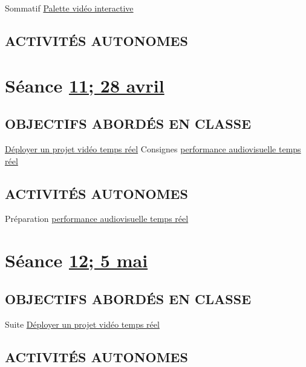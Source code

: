 \documentclass[
  french,
]{book}
\begin{document}
Sommatif \protect\hyperlink{sommatif_4}{Palette vidéo interactive}

\hypertarget{activituxe9s-autonomes-11}{%
\subsection{ACTIVITÉS AUTONOMES}\label{activituxe9s-autonomes-11}}

\hypertarget{semaine_13}{%
\section{\texorpdfstring{Séance \protect\hyperlink{semaine_13}{11; 28 avril}}{Séance 11; 28 avril}}\label{semaine_13}}

\hypertarget{objectifs-aborduxe9s-en-classe-12}{%
\subsection{OBJECTIFS ABORDÉS EN CLASSE}\label{objectifs-aborduxe9s-en-classe-12}}

\protect\hyperlink{deployer}{Déployer un projet vidéo temps réel}
Consignes \protect\hyperlink{sommatif_5}{performance audiovisuelle temps réel}

\hypertarget{activituxe9s-autonomes-12}{%
\subsection{ACTIVITÉS AUTONOMES}\label{activituxe9s-autonomes-12}}

Préparation \protect\hyperlink{sommatif_5}{performance audiovisuelle temps réel}

\hypertarget{semaine_14}{%
\section{\texorpdfstring{Séance \protect\hyperlink{semaine_14}{12; 5 mai}}{Séance 12; 5 mai}}\label{semaine_14}}

\hypertarget{objectifs-aborduxe9s-en-classe-13}{%
\subsection{OBJECTIFS ABORDÉS EN CLASSE}\label{objectifs-aborduxe9s-en-classe-13}}

Suite \protect\hyperlink{deployer}{Déployer un projet vidéo temps réel}

\hypertarget{activituxe9s-autonomes-13}{%
\subsection{ACTIVITÉS AUTONOMES}\label{activituxe9s-autonomes-13}}
\end{document}
